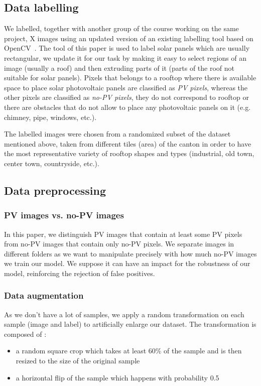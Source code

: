 \documentclass[10pt,conference]{IEEEtran}
\begin{document}
\subsection{Data labelling}
We labelled, together with another group of the course working on the same project, X images using an updated version of an existing labelling tool based on OpenCV~\cite{Castello_2019}. The tool of this paper is used to label solar panels which are usually rectangular, we update it for our task by making it easy to select regions of an image (usually a roof) and then extruding parts of it (parts of the roof not suitable for solar panels). Pixels that belongs to a rooftop where there is available space to place solar photovoltaic panels are classified as \emph{PV pixels}, whereas the other pixels are classified as \emph{no-PV pixels}, they do not correspond to rooftop or there are obstacles that do not allow to place any photovoltaic panels on it (e.g. chimney, pipe, windows, etc.).

The labelled images were chosen from a randomized subset of the dataset mentioned above, taken from different tiles (area) of the canton in order to have the most representative variety of rooftop shapes and types (industrial, old town, center town, countryside, etc.). 

\subsection{Data preprocessing}

\subsubsection{PV images vs. no-PV images}
In this paper, we distinguish PV images that contain at least some PV pixels from no-PV images that contain only no-PV pixels. We separate images in different folders as we want to manipulate precisely with how much no-PV images we train our model. We suppose it can have an impact for the robustness of our model, reinforcing the rejection of false positives.  

\subsubsection{Data augmentation}
As we don’t have a lot of samples, we apply a random transformation on each sample (image and label) to artificially enlarge our dataset. The transformation is composed of :  
\begin{itemize}
	\item a random square crop which takes at least 60\% of the sample and is then resized to the size of the original sample
	\item a horizontal flip of the sample which happens with probability 0.5
\end{itemize}
  
\end{document}
